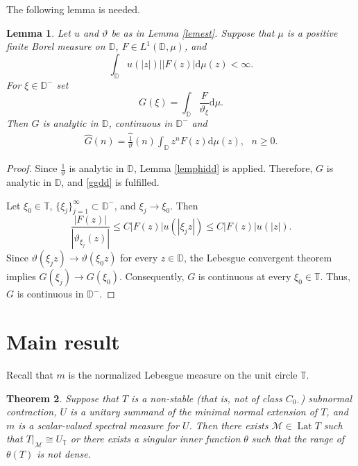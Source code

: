 \documentclass[a4paper,oneside,11pt]{amsart}
\numberwithin{equation}{section}
\theoremstyle{plain}
\newtheorem{theorem}{Theorem}[section]
\newtheorem{lemma}[theorem]{Lemma}
\theoremstyle{definition}
\begin{document}
The following lemma is  needed.

\begin{lemma}\label{lemthetadd} 
 Let $u$ and $\vartheta$ be as in Lemma \ref{lemest}. 
Suppose that $\mu$ is a positive finite Borel measure on $\mathbb D$, 
 $F\in L^1(\mathbb D,\mu)$, and  
\begin{equation*}  \int_{\mathbb D}u(|z|)||F(z)|\mathrm{d}\mu(z)<\infty.
 \end{equation*} 
For $\xi\in\mathbb D^-$ set 
\begin{equation*} G(\xi)=\int_{\mathbb D}\frac{F}{\vartheta_\xi}\mathrm{d}\mu. \end{equation*} 
Then $G$ is analytic in $\mathbb D$,  continuous in $\mathbb D^-$
and 
\begin{align}\label{ggdd}\widehat G(n)=\widehat{\frac{1}{\vartheta}}(n)
\int_{\mathbb D}z^n F(z)\mathrm{d}\mu(z), \ \ \ n\geq 0.\end{align}
\end{lemma}

\begin{proof} Since $\frac{1}{\vartheta}$ is analytic in $\mathbb D$, Lemma \ref{lemphidd} is applied. Therefore,
  $G$ is analytic in $\mathbb D$, and \eqref{ggdd} is fulfilled. 

Let $\xi_0\in\mathbb T$, $\{\xi_j\}_{j=1}^\infty\subset\mathbb D^-$, and $\xi_j\to\xi_0$. 
Then  
\begin{equation*}\frac{|F(z)|}{|\vartheta_{\xi_j}(z)|}\leq C|F(z)|u(|\xi_jz|)\leq C|F(z)|u(|z|).
 \end{equation*} 
Since $\vartheta(\xi_j z)\to \vartheta(\xi_0 z)$ for every $z\in\mathbb D$, the Lebesgue convergent  theorem implies 
 $G(\xi_j)\to G(\xi_0)$. Consequently, $G$ is continuous at every $\xi_0\in\mathbb T$. 
Thus, $G$ is continuous in $\mathbb D^-$.
\end{proof}

\section{Main result}


Recall that $m$ is the normalized Lebesgue measure on the unit circle $\mathbb T$. 


\begin{theorem}\label{thm11} Suppose that $T$ is a non-stable (that is, not of class $C_{0\cdot}$) subnormal contraction, 
$U$ is a unitary summand of the minimal normal extension of $T$, and $m$ is a scalar-valued spectral measure for $U$. 
Then  there exists $\mathcal M\in \operatorname{Lat}T$ such that  $T|_{\mathcal M}\cong U_{\mathbb T}$ or there exists 
a singular inner function $\theta$ such that the range of $\theta(T)$ is not dense.
\end{theorem}
\end{document}
